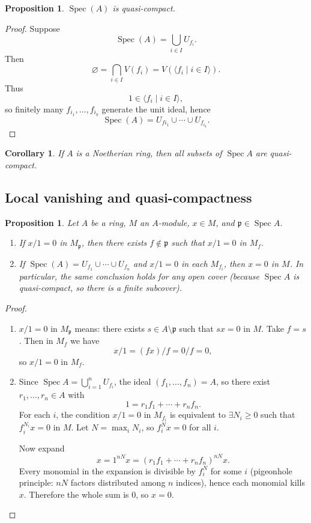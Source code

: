 \documentclass[11pt,a4paper]{article}
\theoremstyle{definition}
\theoremstyle{plain}
\newtheorem{proposition}[definition]{Proposition}
\newtheorem{corollary}[definition]{Corollary}
\theoremstyle{remark}
\newcommand{\Spec}{\operatorname{Spec}}
\begin{document}
\begin{proposition}
$\Spec(A)$ is quasi-compact.
\end{proposition}

\begin{proof}
Suppose
\[
\Spec(A)=\bigcup_{i\in I}U_{f_i}.
\]
Then
\[
\varnothing=\bigcap_{i\in I}V(f_i)=V(\langle f_i\mid i\in I\rangle).
\]
Thus
\[
1\in\langle f_i\mid i\in I\rangle,
\]
so finitely many $f_{i_1},\dots,f_{i_k}$ generate the unit ideal, hence
\[
\Spec(A)=U_{f{i_1}}\cup\cdots\cup U_{f_{i_k}}.
\]
\end{proof}

\begin{corollary}
    If $A$ is a Noetherian ring, then all subsets of $\Spec A$ are quasi-compact. 
\end{corollary}

\subsection{Local vanishing and quasi-compactness}

\begin{proposition}\label{prop:local-vanishing}
    Let $A$ be a ring, $M$ an $A$-module, $x\in M$, and $\mathfrak p\in \Spec A$.
    \begin{enumerate}
    \item If $x/1=0$ in $M_{\mathfrak p}$, then there exists $f\notin\mathfrak p$
    such that $x/1=0$ in $M_f$.
    \item If $\Spec(A)=U_{f_1}\cup\cdots\cup U_{f_n}$ and $x/1=0$ in each $M_{f_i}$,
    then $x=0$ in $M$. In particular, the same conclusion holds for any open cover
    (because $\Spec A$ is quasi-compact, so there is a finite subcover).
    \end{enumerate}
\end{proposition}

\begin{proof}
\begin{enumerate}
\item $x/1=0$ in $M_{\mathfrak p}$ means: there exists $s\in A\setminus\mathfrak p$
such that $sx=0$ in $M$. Take $f=s$. Then in $M_f$ we have
\[
x/1 = (fx)/f = 0/f = 0,
\]
so $x/1=0$ in $M_f$.
\item Since $\Spec A=\bigcup_{i=1}^n U_{f_i}$, the ideal $(f_1,\dots,f_n)=A$,
so there exist $r_1,\dots,r_n\in A$ with
\[
1=r_1f_1+\cdots+r_nf_n.
\]
For each $i$, the condition $x/1=0$ in $M_{f_i}$ is equivalent to
$\exists N_i\ge 0$ such that $f_i^{N_i}x=0$ in $M$.
Let $N=\max_i N_i$, so $f_i^N x=0$ for all $i$.

Now expand
\[
x = 1^{nN}x = (r_1f_1+\cdots+r_nf_n)^{nN}x.
\]
Every monomial in the expansion is divisible by $f_i^N$ for some $i$
(pigeonhole principle: $nN$ factors distributed among $n$ indices),
hence each monomial kills $x$. Therefore the whole sum is $0$, so $x=0$.
\end{enumerate}
\end{proof}
\end{document}
